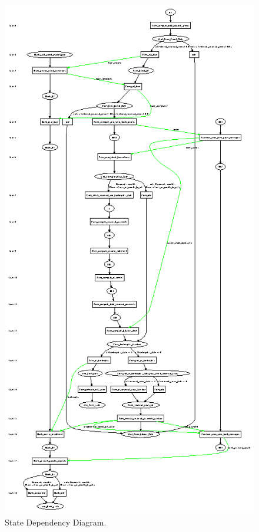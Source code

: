  \begin{figure}[!htb]
 \begin{center}
  \includegraphics*[scale=2.0]{stategraph.ps}
 \caption{State Dependency Diagram.} \label{fig:statecredit}
 \end{center}
 \end{figure}


